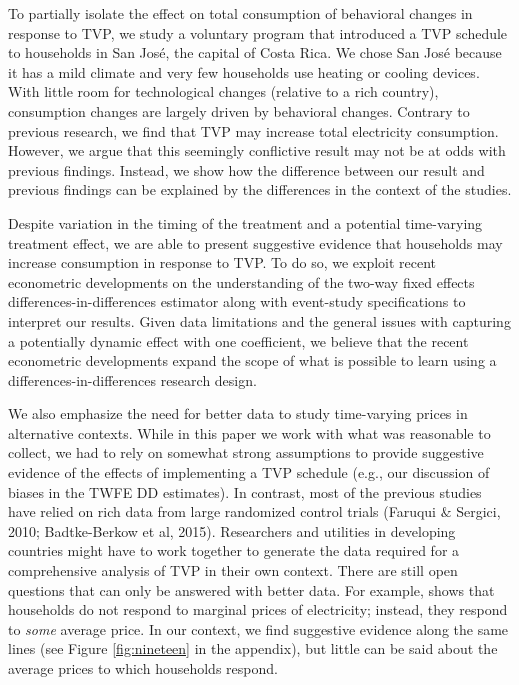\documentclass[12pt]{article}
\begin{document}
To partially isolate the effect on total consumption of behavioral changes in response to TVP, we study a voluntary program that introduced a TVP schedule to households in San José, the capital of Costa Rica. We chose San José because it has a mild climate and very few households use heating or cooling devices. With little room for technological changes (relative to a rich country), consumption changes are largely driven by behavioral changes. Contrary to previous research, we find that TVP may increase total electricity consumption. However, we argue that this seemingly conflictive result may not be at odds with previous findings. Instead, we show how the difference between our result and previous findings can be explained by the differences in the context of the studies.

Despite variation in the timing of the treatment and a potential time-varying treatment effect, we are able to present suggestive evidence that households may increase consumption in response to TVP. To do so, we exploit recent econometric developments on the understanding of the two-way fixed effects differences-in-differences estimator \citep{goodman-baconDifferenceinDifferencesVariationTreatment2018} along with event-study specifications to interpret our results. Given data limitations and the general issues with capturing a potentially dynamic effect with one coefficient, we believe that the recent econometric developments expand the scope of what is possible to learn using a differences-in-differences research design.

We also emphasize the need for better data to study time-varying prices in alternative contexts. While in this paper we work with what was reasonable to collect, we had to rely on somewhat strong assumptions to provide suggestive evidence of the effects of implementing a TVP schedule (e.g., our discussion of biases in the TWFE DD estimates). In contrast, most of the previous studies have relied on rich data from large randomized control trials (Faruqui $\&$  Sergici, 2010; Badtke-Berkow et al, 2015). Researchers and utilities in developing countries might have to work together to generate the data required for a comprehensive analysis of TVP in their own context. There are still open questions that can only be answered with better data. For example, \citep{itoConsumersRespondMarginal2014} shows that households do not respond to marginal prices of electricity; instead, they respond to \emph{some} average price. In our context, we find suggestive evidence along the same lines (see Figure \ref{fig:nineteen} in the appendix), but little can be said about the average prices to which households respond.
\end{document}
